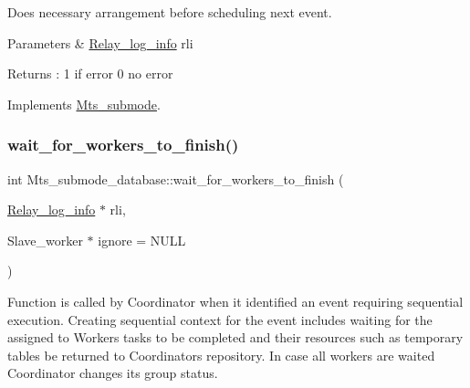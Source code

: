 Does necessary arrangement before scheduling next event. 
\begin{DoxyParams}{Parameters}
{\em } & \mbox{\hyperlink{classRelay__log__info}{Relay\+\_\+log\+\_\+info}} rli \\
\hline
\end{DoxyParams}
\begin{DoxyReturn}{Returns}
\+: 1 if error 0 no error 
\end{DoxyReturn}


Implements \mbox{\hyperlink{classMts__submode}{Mts\+\_\+submode}}.

\mbox{\label{classMts__submode__database_a342d0daf687f50f362ddc86f767da9d0}} 
\subsubsection{\texorpdfstring{wait\+\_\+for\+\_\+workers\+\_\+to\+\_\+finish()}{wait\_for\_workers\_to\_finish()}}
{\footnotesize\ttfamily int Mts\+\_\+submode\+\_\+database\+::wait\+\_\+for\+\_\+workers\+\_\+to\+\_\+finish (\begin{DoxyParamCaption}\item[{\mbox{\hyperlink{classRelay__log__info}{Relay\+\_\+log\+\_\+info}} $\ast$}]{rli,  }\item[{Slave\+\_\+worker $\ast$}]{ignore = {\ttfamily NULL} }\end{DoxyParamCaption})\hspace{0.3cm}{\ttfamily [virtual]}}

Function is called by Coordinator when it identified an event requiring sequential execution. Creating sequential context for the event includes waiting for the assigned to Workers tasks to be completed and their resources such as temporary tables be returned to Coordinator\textquotesingle{}s repository. In case all workers are waited Coordinator changes its group status.


